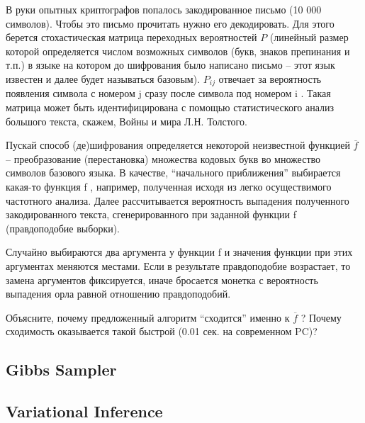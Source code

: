 \begin{problem}

В руки опытных криптографов попалось закодированное письмо (10 000 символов). Чтобы это письмо прочитать нужно его декодировать. Для этого берется стохастическая матрица переходных вероятностей $P$
(линейный размер которой определяется числом возможных символов (букв, знаков препинания и т.п.) в языке на котором до шифрования было написано письмо – этот язык известен и далее будет называться базовым). $P_{ij}$ отвечает за вероятность появления символа с номером j сразу после символа под номером i . Такая матрица может быть идентифицирована с помощью статистического анализ  большого текста, скажем,  Войны и мира Л.Н. Толстого.

Пускай способ (де)шифрования определяется некоторой неизвестной функцией $\overline{f}$ – преобразование (перестановка) множества кодовых букв во множество символов базового языка.
В качестве, “начального приближения” выбирается какая-то функция f , например,
полученная исходя из легко осуществимого частотного анализа. Далее рассчитывается вероятность выпадения полученного закодированного текста, сгенерированного при заданной функции f  (правдоподобие выборки).

Случайно  выбираются два аргумента у функции f и значения функции при этих аргументах меняются местами. Если в результате правдоподобие возрастает, то замена аргументов фиксируется, иначе бросается монетка с вероятность выпадения орла равной отношению правдоподобий. 

Объясните, почему предложенный алгоритм “сходится” именно к $\overline{f}$ ? Почему сходимость оказывается такой быстрой (0.01 сек. на современном PC)?


\end{problem}

\subsection{Gibbs Sampler}

\subsection{Variational Inference}